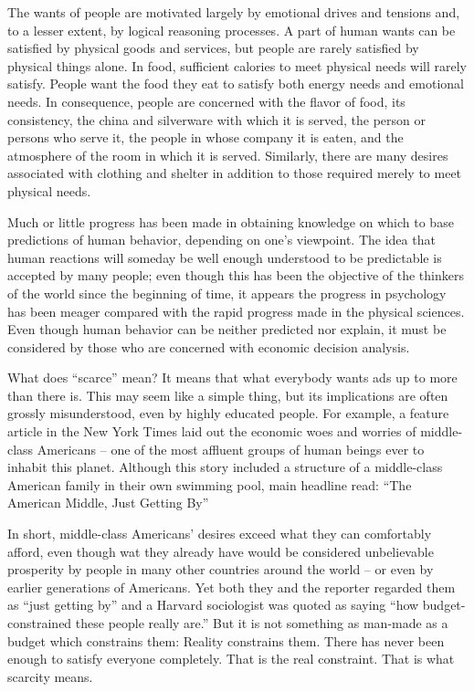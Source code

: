 The wants of people are motivated largely by emotional drives and tensions and, to a lesser extent, by logical reasoning processes. A part of human wants can be satisfied by physical goods and services, but people are rarely satisfied by physical things alone. In food, sufficient calories to meet physical needs will rarely satisfy. People want the food they eat to satisfy both energy needs and emotional needs. In consequence, people are concerned with the flavor of food, its consistency, the china and silverware with which it is served, the person or persons who serve it, the people in whose company it is eaten, and the atmosphere of the room in which it is served. Similarly, there are many desires associated with clothing and shelter in addition to those required merely to meet physical needs.

Much or little progress has been made in obtaining knowledge on which to base predictions of human behavior, depending on one’s viewpoint. The idea that human reactions will someday be well enough understood to be predictable is accepted by many people; even though this has been the objective of the thinkers of the world since the beginning of time, it appears the progress in psychology has been meager compared with the rapid progress made in the physical sciences. Even though human behavior can be neither predicted nor explain, it must be considered by those who are concerned with economic decision analysis.

What does ``scarce'' mean?  It means that what everybody wants ads up to more than there is. This may seem like a simple thing, but its implications are often grossly misunderstood, even by highly educated people. For example, a feature article in the New York Times laid out the economic woes and worries of middle-class Americans – one of the most affluent groups of human beings ever to inhabit this planet. Although this story included a structure of a middle-class American family in their own swimming pool, main headline read: ``The American Middle, Just Getting By''

In short, middle-class Americans’ desires exceed what they can comfortably afford, even though wat they already have would be considered unbelievable prosperity by people in many other countries around the world – or even by earlier generations of Americans. Yet both they and the reporter regarded them as “just getting by” and a Harvard sociologist was quoted as saying “how budget-constrained these people really are.”  But it is not something as man-made as a budget which constrains them: Reality constrains them. There has never been enough to satisfy everyone completely. That is the real constraint. That is what scarcity means.

